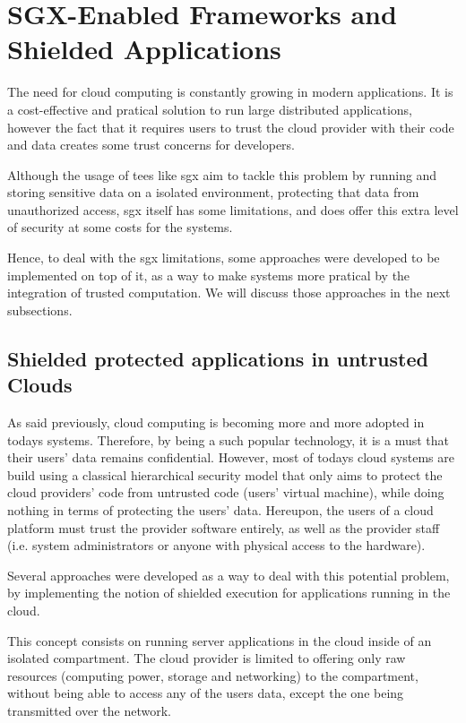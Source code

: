 

\section{SGX-Enabled Frameworks and Shielded Applications}
\label{sec:sgxFrameworks}
The need for cloud computing is constantly growing in modern applications. 
It is a cost-effective and pratical solution to run large distributed applications, however the fact that it requires users to trust the cloud provider with their code and data creates some trust concerns for developers.

Although the usage of \gls{tee}s like \gls{sgx} aim to tackle this problem by running and storing sensitive data on a isolated environment, protecting that data from unauthorized access, \gls{sgx} itself has some limitations, and does offer this extra level of security at some costs for the systems. 

Hence, to deal with the \gls{sgx} limitations, some approaches were developed to be implemented on top of it, as a way to make systems more pratical by the integration of trusted computation. 
We will discuss those approaches in the next subsections.



\subsection{Shielded protected applications in untrusted Clouds}
\label{ssec:shieldedApps}

As said previously, cloud computing is becoming more and more adopted in todays systems. 
Therefore, by being a such popular technology, it is a must that their users' data remains confidential. 
However, most of todays cloud systems are build using a classical hierarchical security model that only aims to protect the cloud providers' code from untrusted code (users' virtual machine), while doing nothing in terms of protecting the users' data. 
Hereupon, the users of a cloud platform must trust the provider software entirely, as well as the provider staff (i.e. system administrators or anyone with physical access to the hardware).

Several approaches were developed as a way to deal with this potential problem, by implementing the notion of shielded execution for applications running in the cloud. 

This concept consists on running server applications in the cloud inside of an isolated compartment. The cloud provider is limited to offering only raw resources (computing power, storage and networking) to the compartment, without being able to access any of the users data, except the one being transmitted over the network. 

